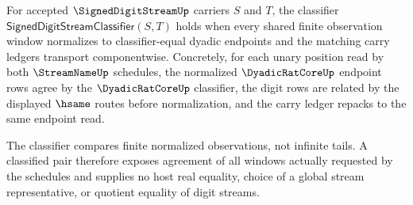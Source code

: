 \begin{definition}
\label{def:signeddigitstream-classifier}
For accepted $\SignedDigitStreamUp$ carriers $S$ and $T$, the classifier $\mathsf{SignedDigitStreamClassifier}(S,T)$ holds when every shared finite observation window normalizes to classifier-equal dyadic endpoints and the matching carry ledgers transport componentwise. Concretely, for each unary position read by both $\StreamNameUp$ schedules, the normalized $\DyadicRatCoreUp$ endpoint rows agree by the $\DyadicRatCoreUp$ classifier, the digit rows are related by the displayed $\hsame$ routes before normalization, and the carry ledger repacks to the same endpoint read.

The classifier compares finite normalized observations, not infinite tails. A classified pair therefore exposes agreement of all windows actually requested by the schedules and supplies no host real equality, choice of a global stream representative, or quotient equality of digit streams.
\end{definition}

